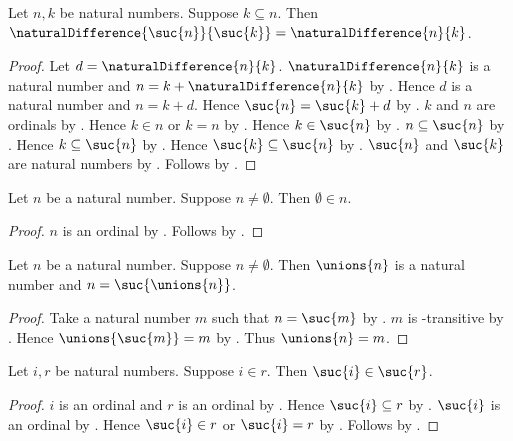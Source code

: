 \begin{proposition}\label{natural_difference_successors}
    Let $n,k$ be natural numbers.
    Suppose $k\subseteq n$.
    Then
        $\naturalDifference{\suc{n}}{\suc{k}}
            =\naturalDifference{n}{k}$.
\end{proposition}
\begin{proof}
    Let $d=\naturalDifference{n}{k}$.
    $\naturalDifference{n}{k}$ is a natural number and
        $n=k+\naturalDifference{n}{k}$ by
        .
    Hence $d$ is a natural number and $n=k+d$.
    Hence $\suc{n}=\suc{k}+d$ by
        .
    $k$ and $n$ are ordinals by
        .
    Hence $k\in n$ or $k=n$ by
        .
    Hence $k\in\suc{n}$ by .
    $n\subseteq\suc{n}$ by .
    Hence $k\subseteq\suc{n}$ by .
    Hence $\suc{k}\subseteq\suc{n}$ by .
    $\suc{n}$ and $\suc{k}$ are natural numbers by
        .
    Follows by .
\end{proof}

\begin{proposition}\label{natural_nonzero_contains_zero}
    Let $n$ be a natural number.
    Suppose $n\neq\emptyset$.
    Then $\emptyset\in n$.
\end{proposition}
\begin{proof}
    $n$ is an ordinal by .
    Follows by .
\end{proof}

\begin{proposition}\label{natural_nonzero_successor_of_union}
    Let $n$ be a natural number.
    Suppose $n\neq\emptyset$.
    Then $\unions{n}$ is a natural number and
        $n=\suc{\unions{n}}$.
\end{proposition}
\begin{proof}
    Take a natural number $m$ such that $n=\suc{m}$
        by .
    $m$ is \in-transitive
        by .
    Hence $\unions{\suc{m}}=m$
        by .
    Thus $\unions{n}=m$.
\end{proof}

\begin{proposition}\label{natural_successor_in_successor_bound}
    Let $i,r$ be natural numbers.
    Suppose $i\in r$.
    Then $\suc{i}\in\suc{r}$.
\end{proposition}
\begin{proof}
    $i$ is an ordinal and $r$ is an ordinal
        by .
    Hence $\suc{i}\subseteq r$ by .
    $\suc{i}$ is an ordinal by .
    Hence $\suc{i}\in r$ or $\suc{i}=r$
        by .
    Follows by .
\end{proof}

